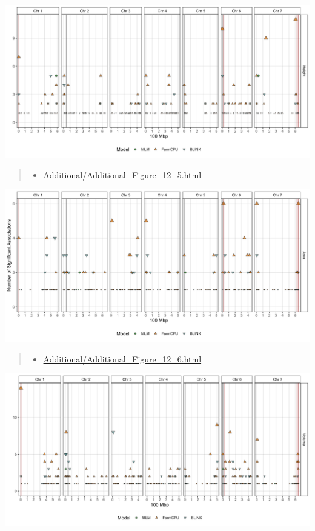 \documentclass[
]{article}
\providecommand{\tightlist}{%
  \setlength{\itemsep}{0pt}\setlength{\parskip}{0pt}}
\begin{document}
\includegraphics{Additional/Additional_Figure_12_4.png}

\pagebreak

\begin{quote}
\begin{itemize}
\tightlist
\item
  \href{https://derekmichaelwright.github.io/AGILE_LDP_UAV/Additional/Additional_Figure_12_5.html}{Additional/Additional\_Figure\_12\_5.html}
\end{itemize}
\end{quote}

\includegraphics{Additional/Additional_Figure_12_5.png}

\begin{quote}
\begin{itemize}
\tightlist
\item
  \href{https://derekmichaelwright.github.io/AGILE_LDP_UAV/Additional/Additional_Figure_12_6.html}{Additional/Additional\_Figure\_12\_6.html}
\end{itemize}
\end{quote}

\includegraphics{Additional/Additional_Figure_12_6.png}
\end{document}
